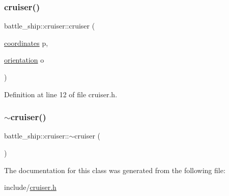 \mbox{\label{classbattle__ship_1_1cruiser_a3460b4b49152a6653122e30224114115}} 
\subsubsection{\texorpdfstring{cruiser()}{cruiser()}\hspace{0.1cm}{\footnotesize\ttfamily [2/2]}}
{\footnotesize\ttfamily battle\+\_\+ship\+::cruiser\+::cruiser (\begin{DoxyParamCaption}\item[{\hyperlink{structbattle__ship_1_1coordinates}{coordinates}}]{p,  }\item[{\hyperlink{namespacebattle__ship_aed87488f0a73f0d0679fe343fb61c784}{orientation}}]{o }\end{DoxyParamCaption})\hspace{0.3cm}{\ttfamily [inline]}}



Definition at line 12 of file cruiser.\+h.

\mbox{\label{classbattle__ship_1_1cruiser_a78e3074b6331c963a2ba3200a14a85c3}} 
\subsubsection{\texorpdfstring{$\sim$cruiser()}{~cruiser()}}
{\footnotesize\ttfamily battle\+\_\+ship\+::cruiser\+::$\sim$cruiser (\begin{DoxyParamCaption}{ }\end{DoxyParamCaption})\hspace{0.3cm}{\ttfamily [default]}}



The documentation for this class was generated from the following file\+:\begin{DoxyCompactItemize}
\item 
include/\hyperlink{cruiser_8h}{cruiser.\+h}\end{DoxyCompactItemize}
